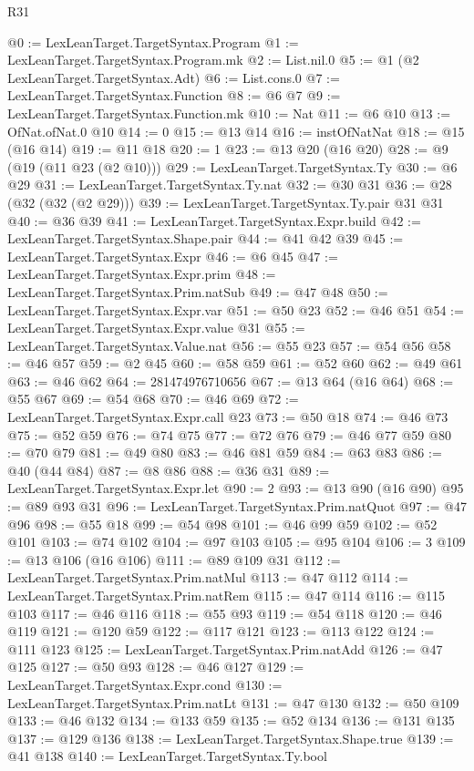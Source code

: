 \begin{lexlean}{R31}
\begin{coremodule}
@0 := LexLeanTarget.TargetSyntax.Program
@1 := LexLeanTarget.TargetSyntax.Program.mk
@2 := List.nil.{0}
@5 := @1 (@2 LexLeanTarget.TargetSyntax.Adt)
@6 := List.cons.{0}
@7 := LexLeanTarget.TargetSyntax.Function
@8 := @6 @7
@9 := LexLeanTarget.TargetSyntax.Function.mk
@10 := Nat
@11 := @6 @10
@13 := OfNat.ofNat.{0} @10
@14 := 0
@15 := @13 @14
@16 := instOfNatNat
@18 := @15 (@16 @14)
@19 := @11 @18
@20 := 1
@23 := @13 @20 (@16 @20)
@28 := @9 (@19 (@11 @23 (@2 @10)))
@29 := LexLeanTarget.TargetSyntax.Ty
@30 := @6 @29
@31 := LexLeanTarget.TargetSyntax.Ty.nat
@32 := @30 @31
@36 := @28 (@32 (@32 (@2 @29)))
@39 := LexLeanTarget.TargetSyntax.Ty.pair @31 @31
@40 := @36 @39
@41 := LexLeanTarget.TargetSyntax.Expr.build
@42 := LexLeanTarget.TargetSyntax.Shape.pair
@44 := @41 @42 @39
@45 := LexLeanTarget.TargetSyntax.Expr
@46 := @6 @45
@47 := LexLeanTarget.TargetSyntax.Expr.prim
@48 := LexLeanTarget.TargetSyntax.Prim.natSub
@49 := @47 @48
@50 := LexLeanTarget.TargetSyntax.Expr.var
@51 := @50 @23
@52 := @46 @51
@54 := LexLeanTarget.TargetSyntax.Expr.value @31
@55 := LexLeanTarget.TargetSyntax.Value.nat
@56 := @55 @23
@57 := @54 @56
@58 := @46 @57
@59 := @2 @45
@60 := @58 @59
@61 := @52 @60
@62 := @49 @61
@63 := @46 @62
@64 := 281474976710656
@67 := @13 @64 (@16 @64)
@68 := @55 @67
@69 := @54 @68
@70 := @46 @69
@72 := LexLeanTarget.TargetSyntax.Expr.call @23
@73 := @50 @18
@74 := @46 @73
@75 := @52 @59
@76 := @74 @75
@77 := @72 @76
@79 := @46 @77 @59
@80 := @70 @79
@81 := @49 @80
@83 := @46 @81 @59
@84 := @63 @83
@86 := @40 (@44 @84)
@87 := @8 @86
@88 := @36 @31
@89 := LexLeanTarget.TargetSyntax.Expr.let
@90 := 2
@93 := @13 @90 (@16 @90)
@95 := @89 @93 @31
@96 := LexLeanTarget.TargetSyntax.Prim.natQuot
@97 := @47 @96
@98 := @55 @18
@99 := @54 @98
@101 := @46 @99 @59
@102 := @52 @101
@103 := @74 @102
@104 := @97 @103
@105 := @95 @104
@106 := 3
@109 := @13 @106 (@16 @106)
@111 := @89 @109 @31
@112 := LexLeanTarget.TargetSyntax.Prim.natMul
@113 := @47 @112
@114 := LexLeanTarget.TargetSyntax.Prim.natRem
@115 := @47 @114
@116 := @115 @103
@117 := @46 @116
@118 := @55 @93
@119 := @54 @118
@120 := @46 @119
@121 := @120 @59
@122 := @117 @121
@123 := @113 @122
@124 := @111 @123
@125 := LexLeanTarget.TargetSyntax.Prim.natAdd
@126 := @47 @125
@127 := @50 @93
@128 := @46 @127
@129 := LexLeanTarget.TargetSyntax.Expr.cond
@130 := LexLeanTarget.TargetSyntax.Prim.natLt
@131 := @47 @130
@132 := @50 @109
@133 := @46 @132
@134 := @133 @59
@135 := @52 @134
@136 := @131 @135
@137 := @129 @136
@138 := LexLeanTarget.TargetSyntax.Shape.true
@139 := @41 @138
@140 := LexLeanTarget.TargetSyntax.Ty.bool

\end{coremodule}
\end{lexlean}
